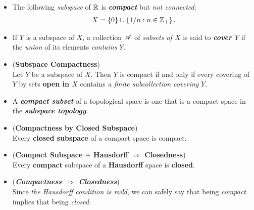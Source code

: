 \documentclass[11pt]{article}
\begin{document}
\begin{itemize}
\item \begin{example}
The following \emph{subspace} of ${\mathbb R}$ is \emph{\textbf{compact}} but \emph{not connected}:
\begin{align*}
X = \left\{0\right\} \cup \left\{1/n: n\in {\mathbb Z}_{+}\right\}.
\end{align*}
\end{example}

\item \begin{definition}
If $Y$ is a subspace of $X$, a collection ${\mathscr A}$ of \emph{subsets of $X$} is said to \emph{\textbf{cover $Y$}} if the \emph{union} of its elements \emph{contains} $Y$.
\end{definition}


\item \begin{lemma}(\textbf{Subspace Compactness}) \citep{munkres2000topology} \\
Let $Y$ be a subspace of $X$. Then $Y$ is compact if and only if every covering of $Y$ by sets \textbf{open in $X$} contains \emph{a finite subcollection covering} $Y$.
\end{lemma}

\item \begin{remark}
A \emph{\textbf{compact subset}} of a topological space is one that is a compact space in the \emph{\textbf{subspace topology}}. 
\end{remark}

\item \begin{proposition} (\textbf{Compactness by Closed Subspace}) \citep{munkres2000topology}\\
Every \textbf{closed subspace} of a compact space is compact.
\end{proposition}

\item \begin{proposition} (\textbf{Compact Subspace $+$ Hausdorff $\Rightarrow$ Closedness}) \citep{munkres2000topology}\\
Every \textbf{compact} subspace of a \textbf{Hausdorff} space is \textbf{closed}.
\end{proposition}

\item \begin{remark} (\textbf{\emph{Compactness $\Rightarrow$ Closedness}})\\
Since \emph{the Hausdorff condition is mild}, we can safely say that being \emph{compact} implies that being \emph{closed}.
\end{remark}


\end{itemize}
\end{document}
